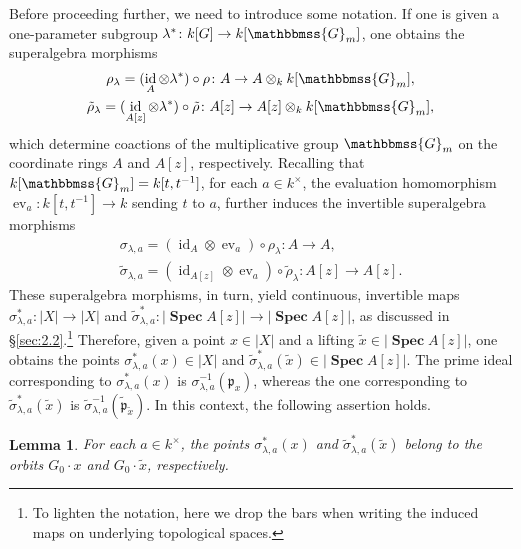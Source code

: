 \documentclass[11pt,a4paper,reqno,noamsfonts]{amsart}
\numberwithin{equation}{section}
\newtheorem{lemma}[theorem]{Lemma}
\theoremstyle{definition}
\theoremstyle{remark}
\newcommand{\GG}{\ensuremath{\mathbbmss{G}}}
\DeclareMathOperator{\id}{id}
\DeclareMathOperator{\ev}{ev}
\DeclareMathOperator{\sSpec}{\mathbf{Spec}}
\begin{document}
Before proceeding further, we need to introduce some notation. If one is given a one-parameter subgroup $\lambda^{*} \colon k[G] \to k[\GG_m]$, one obtains the superalgebra morphisms
\begin{equation}
\begin{gathered} 
  \rho_{\lambda} = (\id_{A} \otimes \lambda^{*}) \circ \rho \colon A \to A \otimes_k k[\GG_m], \\     
   \tilde{\rho}_{\lambda} = (\id_{A[z]} \otimes \lambda^{*}) \circ \tilde{\rho} \colon A[z] \to A[z] \otimes_k k[\GG_m], 
  \end{gathered}
\end{equation}
which determine coactions of the multiplicative group $\GG_{m}$ on the coordinate rings $A$ and $A[z]$, respectively. Recalling that $k[\GG_m] = k[t,t^{-1}]$, for each $a \in k^\times$, the evaluation homomorphism $\ev_a \colon k[t,t^{-1}] \to k$ sending $t$ to $a$, further induces the invertible superalgebra morphisms
\begin{equation}
\begin{gathered}
    \sigma_{\lambda,a} = (\id_{A} \otimes \ev_a) \circ \rho_{\lambda} \colon A \to A, \\
    \tilde{\sigma}_{\lambda,a} = (\id_{A[z]} \otimes \ev_a) \circ \tilde{\rho}_{\lambda} \colon A[z] \to A[z]. 
\end{gathered}
\end{equation}
These superalgebra morphisms, in turn, yield continuous, invertible maps $\sigma_{\lambda,a}^*\colon \lvert X \rvert \to \lvert X \rvert$ and $ \tilde{\sigma}_{\lambda,a}^* \colon \lvert \sSpec A[z] \rvert \to \lvert \sSpec A[z] \rvert$, as discussed in \S\ref{sec:2.2}.\footnote{To lighten the notation, here we drop the bars when writing the induced maps on underlying topological spaces.} Therefore, given a point $x \in \lvert X \rvert$ and a lifting $\tilde{x} \in \lvert \sSpec A[z] \rvert$, one obtains the points $ \sigma_{\lambda,a}^*(x) \in \lvert X \rvert$ and $\tilde{\sigma}_{\lambda,a}^*(\tilde{x}) \in \lvert \sSpec A[z] \rvert$. The prime ideal corresponding to $\sigma_{\lambda,a}^*(x)$ is $\sigma_{\lambda,a}^{-1}(\mathfrak{p}_x)$, whereas the one corresponding to $\tilde{\sigma}_{\lambda,a}^*(\tilde{x})$ is $\tilde{\sigma}_{\lambda,a}^{-1}(\tilde{\mathfrak{p}}_{\tilde{x}})$. In this context, the following assertion holds.

\begin{lemma}\label{lem:4.9}
For each $a \in k^{\times}$, the points $\sigma_{\lambda,a}^*(x)$ and $\tilde{\sigma}_{\lambda,a}^*(\tilde{x})$ belong to the orbits $G_0 \cdot x$ and $G_0 \cdot \tilde{x}$, respectively.
\end{lemma}
\end{document}
